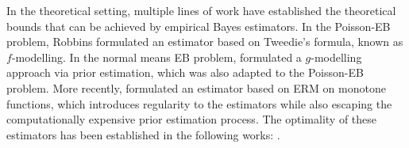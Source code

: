 In the theoretical setting, multiple lines of work have established the theoretical bounds that can be achieved by empirical Bayes estimators. 
In the Poisson-EB problem, Robbins \cite{Rob51, Rob56} formulated an estimator based on Tweedie's formula, known as $f$-modelling. In the normal means EB problem, \cite{jiang2009general} formulated a $g$-modelling approach via prior estimation, which was also adapted to the Poisson-EB problem. 
More recently, \cite{jana2023empirical} formulated an estimator based on ERM on monotone functions, 
which introduces regularity to the estimators while also escaping the computationally expensive prior estimation process. 
The optimality of these estimators has been established in the following works: 
\cite{brown2013poisson, polyanskiy2021sharp, jana2022optimal, jana2023empirical}.
